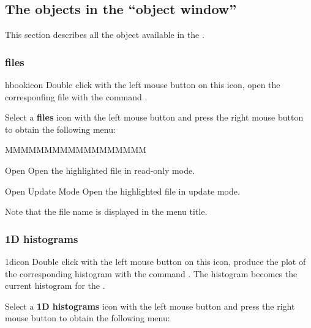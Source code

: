 \subsection{The objects in the ``object window''}
This section describes all the \PAWPP{} object available in the \MB{}.

\subsubsection{\HBOOK{} files}
\begin{ICON}{hbookicon}
Double click with the left mouse button on this icon, open the corresponfing
\HBOOK{} file with the command .
\end{ICON}

Select a {\bf \HBOOK{} files} icon with the left mouse button and press
the right mouse button to obtain the following menu:


\begin{DLsf}{MMMMMMMMMMMMMMMMMM}
\item[Open]              Open the highlighted \HBOOK{} file in read-only mode.
\item[Open Update Mode]  Open the highlighted \HBOOK{} file in update mode.
\end{DLsf}

Note that the \HBOOK{} file name is displayed in the menu title.


\subsubsection{1D histograms}
\begin{ICON}{1dicon}
Double click with the left mouse button on this icon, produce the plot of the
corresponding histogram with the command  . The histogram
becomes the current histogram for the \HSP.
\end{ICON}

Select a {\bf 1D histograms} icon with the left mouse button and press
the right mouse button to obtain the following menu:


